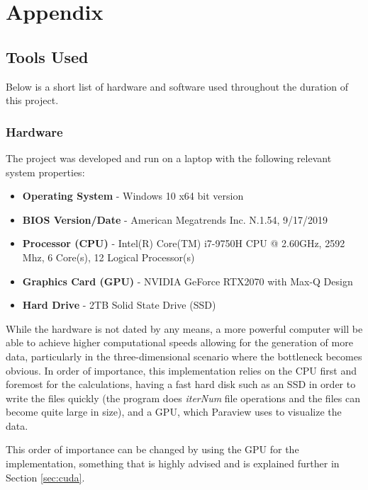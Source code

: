 
\chapter{Appendix} %

\label{AppendixA} %

\section{Tools Used}
Below is a short list of hardware and software used throughout the duration of this project.
 
\subsection{Hardware}
The project was developed and run on a laptop with the following relevant system properties:

\begin{itemize}
	\item \textbf{Operating System} - Windows 10 x64 bit version
	\item \textbf{BIOS Version/Date} - American Megatrends Inc. N.1.54, 9/17/2019
	\item \textbf{Processor (CPU)} - Intel(R) Core(TM) i7-9750H CPU @ 2.60GHz, 2592 Mhz, 6 Core(s), 12 Logical Processor(s)
	\item \textbf{Graphics Card (GPU)} - NVIDIA GeForce RTX2070 with Max-Q Design
	\item \textbf{Hard Drive} - 2TB Solid State Drive (SSD)
\end{itemize}

While the hardware is not dated by any means, a more powerful computer will be able to achieve higher computational speeds allowing for the generation of more data, particularly in the three-dimensional scenario where the bottleneck becomes obvious. In order of importance, this implementation relies on the CPU first and foremost for the calculations, having a fast hard disk such as an SSD in order to write the files quickly (the program does \textit{iterNum} file operations and the files can become quite large in size), and a GPU, which Paraview uses to visualize the data. 

This order of importance can be changed by using the GPU for the implementation, something that is highly advised and is explained further in Section \ref{sec:cuda}. 

